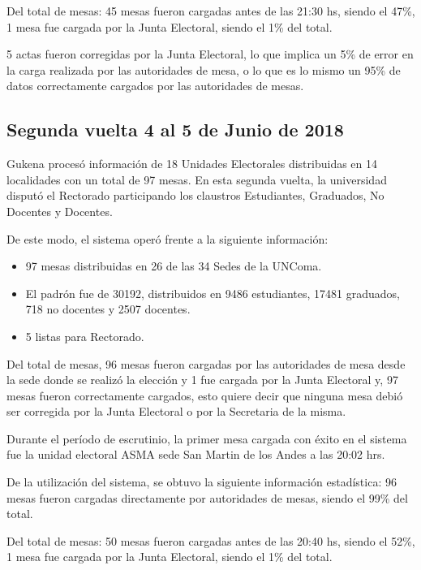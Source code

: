 Del total de mesas:
45 mesas fueron cargadas antes de las 21:30 hs, siendo el 47\%,
1 mesa fue cargada 	por la Junta Electoral, siendo el 1\% del total.

5 actas fueron corregidas por la Junta Electoral, lo que implica un 5\% de error en la carga realizada por las autoridades de mesa, o lo que es lo mismo un 95\% de datos correctamente cargados por las autoridades de mesas.

\subsection{Segunda vuelta 4 al 5 de Junio de 2018}
Gukena procesó información de 18 Unidades Electorales distribuidas en 14 localidades con un total de 97 mesas. En esta segunda vuelta, la universidad disputó el Rectorado participando los claustros Estudiantes, Graduados, No Docentes y Docentes.

De este modo, el sistema operó frente a la siguiente información:
\begin{itemize}
    \item 97 mesas distribuidas en 26 de las 34 Sedes de la UNComa.
     \item El padrón fue de  30192, distribuidos en 9486 estudiantes, 17481 graduados, 718 no docentes y 2507 docentes.
     \item 5 listas para Rectorado.
\end{itemize}
Del total de mesas, 96 mesas fueron cargadas por las autoridades de mesa desde la sede donde se realizó la elección y 1 fue cargada por la Junta Electoral y, 97 mesas fueron correctamente cargados, esto quiere decir que ninguna mesa debió ser corregida por la Junta Electoral o por la Secretaria de la misma.

Durante el período de escrutinio, la primer mesa cargada con éxito en el sistema fue la unidad electoral ASMA sede San Martin de los Andes a las 20:02 hrs.

De la utilización del sistema, se obtuvo la siguiente información estadística:
96 mesas fueron cargadas directamente por autoridades de mesas, siendo el 99\% del total.

Del total de mesas:
50 mesas fueron cargadas antes de las 20:40 hs, siendo el 52\%,
1 mesa fue cargada 	por la Junta Electoral, siendo el 1\% del total.

